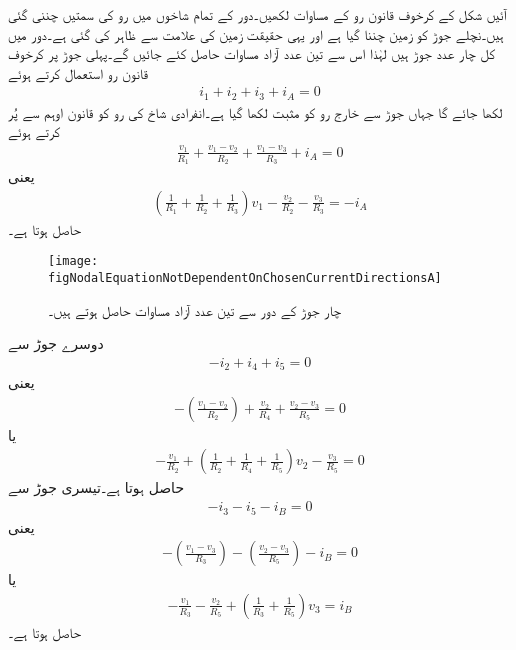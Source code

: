 آئیں شکل  کے کرخوف قانون رو  کے مساوات لکھیں۔دور کے تمام شاخوں میں رو کی سمتیں چننی گئی ہیں۔نچلے جوڑ کو زمین چننا گیا ہے اور یہی حقیقت زمین کی علامت سے ظاہر کی گئی ہے۔دور میں کل چار  عدد جوڑ ہیں لہٰذا اس سے تین  عدد آزاد مساوات حاصل کئے جائیں گے۔پہلی جوڑ پر کرخوف قانون رو استعمال کرتے ہوئے
\begin{align*}
i_1+i_2+i_3+i_A=0
\end{align*}
لکھا جائے گا جہاں جوڑ سے خارج رو کو مثبت لکھا گیا ہے۔انفرادی شاخ کی رو کو قانون اوہم سے پُر کرتے ہوئے
\begin{align*}
\frac{v_1}{R_1}+\frac{v_1-v_2}{R_2}+\frac{v_1-v_3}{R_3}+i_A=0
\end{align*}
یعنی
\begin{align}\label{مساوات_جوڑ_چار_جوڑ_تین_آزاد_الف}
\left(\frac{1}{R_1}+\frac{1}{R_2}+\frac{1}{R_3}\right)v_1-\frac{v_2}{R_2}-\frac{v_3}{R_3}=-i_A
\end{align}
حاصل ہوتا ہے۔
\begin{figure}
\centering
\texttt{[image: figNodalEquationNotDependentOnChosenCurrentDirectionsA]}
\caption{چار جوڑ کے دور سے تین عدد آزاد مساوات حاصل ہوتے ہیں۔}
\label{شکل_جوڑ_چار_جوڑ_تین_آزاد_مساوات_الف}
\end{figure}%
دوسرے جوڑ سے
\begin{align*}
-i_2+i_4+i_5=0
\end{align*}
یعنی
\begin{align*}
-\left(\frac{v_1-v_2}{R_2}\right)+\frac{v_2}{R_4}+\frac{v_2-v_3}{R_5}=0
\end{align*}
یا
\begin{align}\label{مساوات_جوڑ_چار_جوڑ_تین_آزاد_ب}
-\frac{v_1}{R_2}+\left(\frac{1}{R_2}+\frac{1}{R_4}+\frac{1}{R_5}\right)v_2-\frac{v_3}{R_5}=0
\end{align}
حاصل ہوتا ہے۔تیسری جوڑ سے
\begin{align*}
-i_3-i_5-i_B=0
\end{align*}
یعنی
\begin{align*}
-\left(\frac{v_1-v_3}{R_3}\right)-\left(\frac{v_2-v_3}{R_5}\right)-i_B=0
\end{align*}
یا
\begin{align}\label{مساوات_جوڑ_چار_جوڑ_تین_آزاد_پ}
-\frac{v_1}{R_3}-\frac{v_2}{R_5}+\left(\frac{1}{R_3}+\frac{1}{R_5}\right)v_3=i_B
\end{align}
حاصل ہوتا ہے۔

